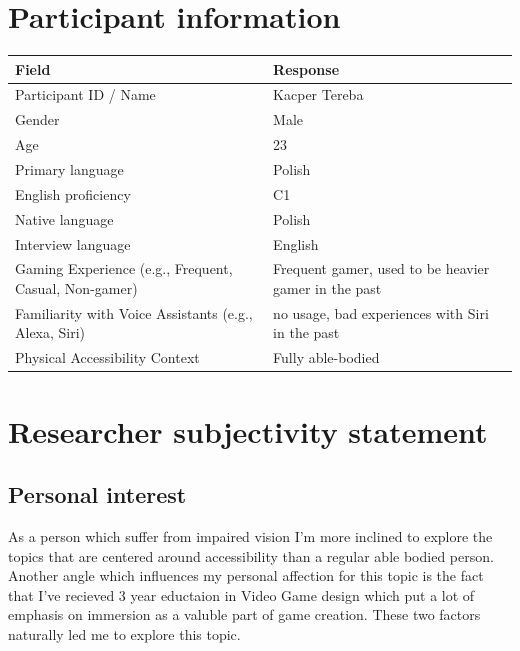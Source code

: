 \section{Participant information}
\begin{table}[h]
\centering
\begin{tabular}{|p{5cm}|p{10cm}|}
\hline
\textbf{Field} & \textbf{Response} \\ \hline
Participant ID / Name & Kacper Tereba\\[1.5cm] \hline
Gender & Male \\[1.5cm] \hline
Age & 23 \\[1.5cm] \hline
Primary language & Polish \\[1.5cm] \hline
English proficiency & C1 \\[1.5cm] \hline
Native language & Polish \\[1.5cm] \hline
Interview language & English \\[1.5cm] \hline
Gaming Experience (e.g., Frequent, Casual, Non-gamer) & Frequent gamer, used to be heavier gamer in the past \\[1.5cm] \hline %
Familiarity with Voice Assistants (e.g., Alexa, Siri) & no usage, bad experiences with Siri in the past  \\[1.5cm] \hline
Physical Accessibility Context & Fully able-bodied \\[2cm] \hline
\end{tabular}
\end{table}


\section{Researcher subjectivity statement}

\subsection{Personal interest}

    As a person which suffer from impaired vision I'm more inclined to explore the topics that are centered around accessibility than a regular able bodied person.
Another angle which influences my personal affection for this topic is the fact that I've recieved 3 year eductaion in Video Game design which put a lot of emphasis on immersion
as a valuble part of game creation. These two factors naturally led me to explore this topic.
